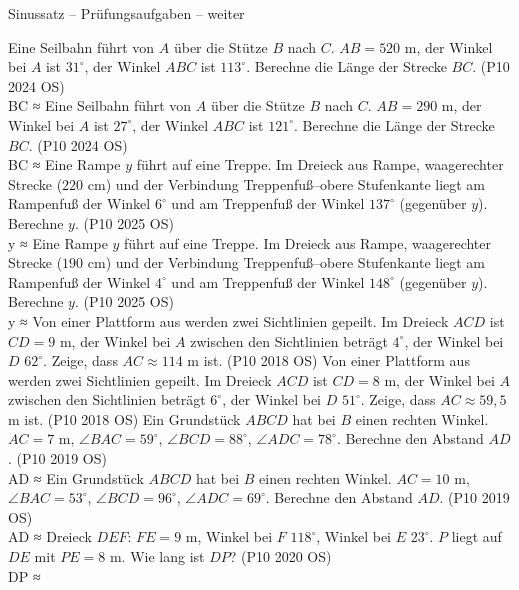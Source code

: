 \begin{aufgabe}{Sinussatz – Prüfungsaufgaben – weiter}
\begin{teile}
\steil Eine Seilbahn führt von $A$ über die Stütze $B$ nach $C$. $AB = 520$ m, der Winkel bei $A$ ist $31^\circ$, der Winkel $ABC$ ist $113^\circ$. Berechne die Länge der Strecke $BC$. \hfill (P10 2024 OS) \\ BC ≈ \leerfeld[m]
\steil Eine Seilbahn führt von $A$ über die Stütze $B$ nach $C$. $AB = 290$ m, der Winkel bei $A$ ist $27^\circ$, der Winkel $ABC$ ist $121^\circ$. Berechne die Länge der Strecke $BC$. \hfill (P10 2024 OS) \\ BC ≈ \leerfeld[m]
\steil Eine Rampe $y$ führt auf eine Treppe. Im Dreieck aus Rampe, waagerechter Strecke ($220$ cm) und der Verbindung Treppenfuß–obere Stufenkante liegt am Rampenfuß der Winkel $6^\circ$ und am Treppenfuß der Winkel $137^\circ$ (gegenüber $y$). Berechne $y$. \hfill (P10 2025 OS) \\ y ≈ \leerfeld[cm]
\steil Eine Rampe $y$ führt auf eine Treppe. Im Dreieck aus Rampe, waagerechter Strecke ($190$ cm) und der Verbindung Treppenfuß–obere Stufenkante liegt am Rampenfuß der Winkel $4^\circ$ und am Treppenfuß der Winkel $148^\circ$ (gegenüber $y$). Berechne $y$. \hfill (P10 2025 OS) \\ y ≈ \leerfeld[cm]
\steil Von einer Plattform aus werden zwei Sichtlinien gepeilt. Im Dreieck $ACD$ ist $CD = 9$ m, der Winkel bei $A$ zwischen den Sichtlinien beträgt $4^\circ$, der Winkel bei $D$ $62^\circ$. Zeige, dass $AC \approx 114$ m ist. \hfill (P10 2018 OS)
\steil Von einer Plattform aus werden zwei Sichtlinien gepeilt. Im Dreieck $ACD$ ist $CD = 8$ m, der Winkel bei $A$ zwischen den Sichtlinien beträgt $6^\circ$, der Winkel bei $D$ $51^\circ$. Zeige, dass $AC \approx 59{,}5$ m ist. \hfill (P10 2018 OS)
\steil Ein Grundstück $ABCD$ hat bei $B$ einen rechten Winkel. $AC = 7$ m, $\angle BAC = 59^\circ$, $\angle BCD = 88^\circ$, $\angle ADC = 78^\circ$. Berechne den Abstand $AD$. \hfill (P10 2019 OS) \\ AD ≈ \leerfeld[m]
\steil Ein Grundstück $ABCD$ hat bei $B$ einen rechten Winkel. $AC = 10$ m, $\angle BAC = 53^\circ$, $\angle BCD = 96^\circ$, $\angle ADC = 69^\circ$. Berechne den Abstand $AD$. \hfill (P10 2019 OS) \\ AD ≈ \leerfeld[m]
\steil Dreieck $DEF$: $FE = 9$ m, Winkel bei $F$ $118^\circ$, Winkel bei $E$ $23^\circ$. $P$ liegt auf $DE$ mit $PE = 8$ m. Wie lang ist $DP$? \hfill (P10 2020 OS) \\ DP ≈ \leerfeld[m]

\end{teile}
\end{aufgabe}
